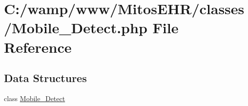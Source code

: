 \hypertarget{_mobile___detect_8php}{\section{\-C\-:/wamp/www/\-Mitos\-E\-H\-R/classes/\-Mobile\-\_\-\-Detect.php \-File \-Reference}
\label{_mobile___detect_8php}
}
\subsection*{\-Data \-Structures}
\begin{DoxyCompactItemize}
\item 
class \hyperlink{class_mobile___detect}{\-Mobile\-\_\-\-Detect}
\end{DoxyCompactItemize}
